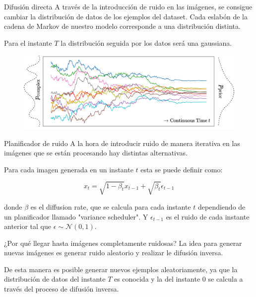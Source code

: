 \begin{frame}{Difusión directa}
A través de la introducción de \alert{ruido} en las imágenes, se consigue cambiar la \alert{distribución de datos} de los ejemplos del dataset. Cada eslabón de la \alert{cadena de Markov} de nuestro modelo corresponde a una distribución distinta.

Para el instante \alert{$T$} la distribución seguida por los datos será una \alert{gaussiana}.

\begin{figure}
    \centering
    \includegraphics[width=\textwidth]{figures/Diffusion_Models/ForwardDiffusion.png}
    \caption{\cite{ForwardDiffusion}}
\end{figure}
\end{frame}

\begin{frame}{Planificador de ruido}
A la hora de introducir ruido de manera \alert{iterativa} en las imágenes que se están procesando hay distintas alternativas.

Para cada imagen generada en un instante $t$ esta se puede definir como:

\begin{equation}
    x_t = \sqrt{1-\beta_t} x_{t-1} + \sqrt{\beta_t} \epsilon_{t-1}
\end{equation}

donde $\beta$ es el \alert{diffusion rate}, que se calcula para cada instante $t$ dependiendo de un planificador llamado "\alert{variance scheduler}". Y $\epsilon_{t-1}$ es el ruido de cada instante anterior tal que \alert{$\epsilon \sim \mathcal{N}(0,1)$}.

\end{frame}

\begin{frame}{¿Por qué llegar hasta imágenes completamente ruidosas?}
La idea para generar \alert{nuevas imágenes} es generar \alert{ruido aleatorio} y realizar le difusión inversa.

De esta manera es posible generar \alert{nuevos ejemplos} aleatoriamente, ya que la distribución de datos del instante \alert{$T$} es conocida y la del instante \alert{$0$} se calcula a través del proceso de difusión inversa.
\end{frame}

